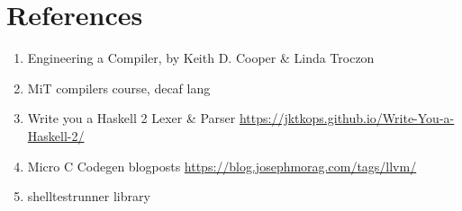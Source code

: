 \documentclass{article}
\begin{document}
\section{References}
\begin{enumerate}
    \item  Engineering a Compiler, by Keith D. Cooper & Linda Troczon
    \item MiT compilers course, decaf lang
    \item Write you a Haskell 2 Lexer \& Parser \url{https://jktkops.github.io/Write-You-a-Haskell-2/}
    \item Micro C Codegen blogposts \url{https://blog.josephmorag.com/tags/llvm/}
    \item shelltestrunner library
\end{enumerate}
\end{document}
